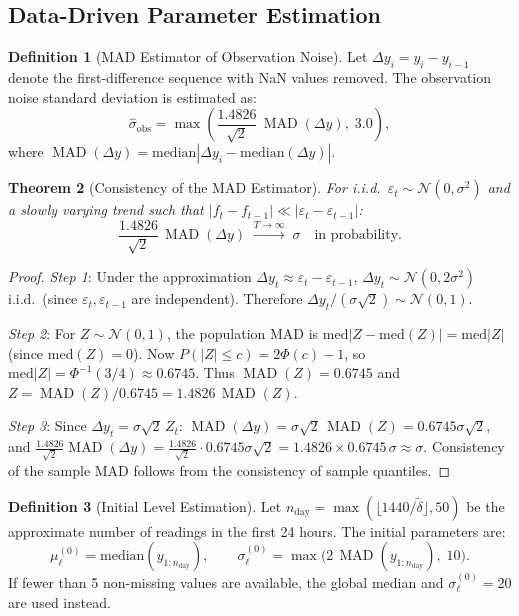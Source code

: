 \documentclass[11pt, a4paper]{article}
\theoremstyle{plain}
\newtheorem{theorem}{Theorem}[section]
\theoremstyle{definition}
\newtheorem{definition}[theorem]{Definition}
\newcommand{\N}{\mathcal{N}}
\DeclareMathOperator{\MAD}{MAD}
\begin{document}
\subsection{Data-Driven Parameter Estimation}\label{sec:params}

\begin{definition}[MAD Estimator of Observation Noise]
Let $\Delta y_i = y_i - y_{i-1}$ denote the first-difference sequence with
NaN values removed. The observation noise standard deviation is estimated as:
\[
  \hat\sigma_{\mathrm{obs}} = \max\!\left(
    \frac{1.4826}{\sqrt{2}}\,\MAD(\Delta y),\; 3.0
  \right),
\]
where $\MAD(\Delta y) = \mathrm{median}|\Delta y_i - \mathrm{median}(\Delta y)|$.
\end{definition}

\begin{theorem}[Consistency of the MAD Estimator]\label{thm:mad}
For i.i.d.\ $\varepsilon_t \sim \N(0, \sigma^2)$ and a slowly varying trend
such that $|f_t - f_{t-1}| \ll |\varepsilon_t - \varepsilon_{t-1}|$:
\[
  \frac{1.4826}{\sqrt{2}}\,\MAD(\Delta y)
  \;\xrightarrow{T \to \infty}\; \sigma \quad\text{in probability.}
\]
\end{theorem}
\begin{proof}
\textit{Step 1}: Under the approximation $\Delta y_t \approx \varepsilon_t - \varepsilon_{t-1}$,
$\Delta y_t \sim \N(0, 2\sigma^2)$ i.i.d.\ (since $\varepsilon_t, \varepsilon_{t-1}$ are independent).
Therefore $\Delta y_t / (\sigma\sqrt{2}) \sim \N(0,1)$.

\textit{Step 2}: For $Z \sim \N(0,1)$, the population MAD is
$\mathrm{med}|Z - \mathrm{med}(Z)| = \mathrm{med}|Z|$ (since $\mathrm{med}(Z)=0$).
Now $P(|Z| \leq c) = 2\Phi(c) - 1$, so $\mathrm{med}|Z| = \Phi^{-1}(3/4) \approx 0.6745$.
Thus $\MAD(Z) = 0.6745$ and $Z = \MAD(Z) / 0.6745 = 1.4826\,\MAD(Z)$.

\textit{Step 3}: Since $\Delta y_t = \sigma\sqrt{2}\,Z_t$:
$\MAD(\Delta y) = \sigma\sqrt{2}\,\MAD(Z) = 0.6745\sigma\sqrt{2}$,
and
$\frac{1.4826}{\sqrt{2}}\MAD(\Delta y) = \frac{1.4826}{\sqrt{2}} \cdot 0.6745\sigma\sqrt{2}
= 1.4826 \times 0.6745\,\sigma \approx \sigma$.
Consistency of the sample MAD follows from the consistency of sample quantiles.
\end{proof}

\begin{definition}[Initial Level Estimation]
Let $n_{\mathrm{day}} = \max(\lfloor 1440 / \tilde\delta \rfloor, 50)$ be the
approximate number of readings in the first 24 hours. The initial parameters are:
\[
  \mu_\ell^{(0)} = \mathrm{median}(y_{1:n_{\mathrm{day}}}),
  \qquad
  \sigma_\ell^{(0)} = \max\!\bigl(2\,\MAD(y_{1:n_{\mathrm{day}}}),\; 10\bigr).
\]
If fewer than 5 non-missing values are available, the global median and
$\sigma_\ell^{(0)} = 20$ are used instead.
\end{definition}
\end{document}
